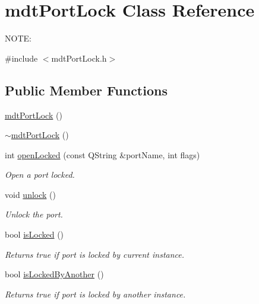 \hypertarget{classmdt_port_lock}{\section{mdt\-Port\-Lock Class Reference}
\label{classmdt_port_lock}
}


N\-O\-T\-E\-:  




{\ttfamily \#include $<$mdt\-Port\-Lock.\-h$>$}

\subsection*{Public Member Functions}
\begin{DoxyCompactItemize}
\item 
\hyperlink{classmdt_port_lock_a90323fa64e81c96e4db36253845262b8}{mdt\-Port\-Lock} ()
\item 
\hyperlink{classmdt_port_lock_ac8b6e1a528bff0d90b0efec4dc7fd8fd}{$\sim$mdt\-Port\-Lock} ()
\item 
int \hyperlink{classmdt_port_lock_a25e9a2cb8a10069fae75c76b6809c27f}{open\-Locked} (const Q\-String \&port\-Name, int flags)
\begin{DoxyCompactList}\small\item\em Open a port locked. \end{DoxyCompactList}\item 
void \hyperlink{classmdt_port_lock_a60b65f02d57568dc36c5e918aa5357a6}{unlock} ()
\begin{DoxyCompactList}\small\item\em Unlock the port. \end{DoxyCompactList}\item 
bool \hyperlink{classmdt_port_lock_a07a7d13509147d65dde89e95ac343eb2}{is\-Locked} ()
\begin{DoxyCompactList}\small\item\em Returns true if port is locked by current instance. \end{DoxyCompactList}\item 
bool \hyperlink{classmdt_port_lock_a739a8cedebb1a32e122c7e451f0cfe98}{is\-Locked\-By\-Another} ()
\begin{DoxyCompactList}\small\item\em Returns true if port is locked by another instance. \end{DoxyCompactList}\end{DoxyCompactItemize}


